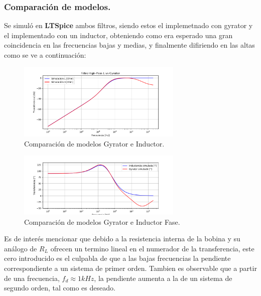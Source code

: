 \documentclass[a4paper]{article}
\begin{document}
\subsubsection{Comparación de modelos.}
Se simuló en \textbf{LTSpice} ambos filtros, siendo estos el implemetnado con gyrator y el implementado con un inductor, obteniendo como era esperado una gran coincidencia en las frecuencias bajas y medias, y finalmente difiriendo en las altas como se ve a continuación:
\begin{figure}[H]	
	\centering
	\includegraphics[width=0.7\textwidth]{ImagenesEj2/simHP.PNG}
	\caption{Comparación de modelos Gyrator e Inductor.}
	\label{fig:gyrInd}
\end{figure}
\begin{figure}[H]	
	\centering
	\includegraphics[width=0.7\textwidth]{ImagenesEj2/simHPP.PNG}
	\caption{Comparación de modelos Gyrator e Inductor Fase.}
	\label{fig:gyrIndP}
\end{figure}
Es de interés mencionar que debido a la resistencia interna de la bobina y su análogo de $R_L$ ofrecen un termino lineal en el numerador de la transferencia, este cero introducido es el culpabla de que a las bajas frecuencias la pendiente correspondiente a un sistema de primer orden. Tambien es observable que a partir de una frecuencia, $f_d \approx 1kHz $, la pendiente aumenta a la de un sistema de segundo orden, tal como es deseado.
\end{document}
